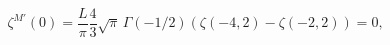\begin{equation}
\label{1bravac}
\zeta^{M\prime}(0)=\frac{L}{\pi}\frac 4 3\sqrt{\pi}\,\Gamma(-1/2)
\left(\zeta(-4,2)-\zeta(-2,2)\right)=0,
\end{equation}

